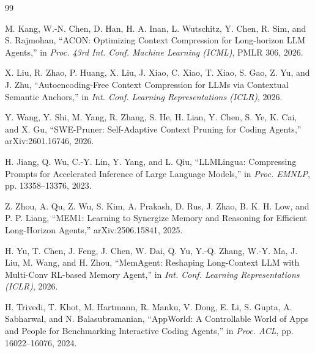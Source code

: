 \documentclass[10pt,a4paper]{article}
\begin{document}
\begin{thebibliography}{99}

M. Kang, W.-N. Chen, D. Han, H. A. Inan, L. Wutschitz, Y. Chen, R. Sim, and
S. Rajmohan,
``ACON: Optimizing Context Compression for Long-horizon LLM Agents,''
in \emph{Proc. 43rd Int. Conf. Machine Learning (ICML)}, PMLR 306, 2026.

X. Liu, R. Zhao, P. Huang, X. Liu, J. Xiao, C. Xiao, T. Xiao, S. Gao, Z. Yu,
and J. Zhu,
``Autoencoding-Free Context Compression for LLMs via Contextual Semantic
Anchors,''
in \emph{Int. Conf. Learning Representations (ICLR)}, 2026.

Y. Wang, Y. Shi, M. Yang, R. Zhang, S. He, H. Lian, Y. Chen, S. Ye, K. Cai,
and X. Gu,
``SWE-Pruner: Self-Adaptive Context Pruning for Coding Agents,''
arXiv:2601.16746, 2026.

H. Jiang, Q. Wu, C.-Y. Lin, Y. Yang, and L. Qiu,
``LLMLingua: Compressing Prompts for Accelerated Inference of Large Language
Models,''
in \emph{Proc. EMNLP}, pp. 13358--13376, 2023.

Z. Zhou, A. Qu, Z. Wu, S. Kim, A. Prakash, D. Rus, J. Zhao, B. K. H. Low, and
P. P. Liang,
``MEM1: Learning to Synergize Memory and Reasoning for Efficient Long-Horizon
Agents,''
arXiv:2506.15841, 2025.

H. Yu, T. Chen, J. Feng, J. Chen, W. Dai, Q. Yu, Y.-Q. Zhang, W.-Y. Ma, J. Liu,
M. Wang, and H. Zhou,
``MemAgent: Reshaping Long-Context LLM with Multi-Conv RL-based Memory Agent,''
in \emph{Int. Conf. Learning Representations (ICLR)}, 2026.

H. Trivedi, T. Khot, M. Hartmann, R. Manku, V. Dong, E. Li, S. Gupta,
A. Sabharwal, and N. Balasubramanian,
``AppWorld: A Controllable World of Apps and People for Benchmarking
Interactive Coding Agents,''
in \emph{Proc. ACL}, pp. 16022--16076, 2024.

\end{thebibliography}
\end{document}
